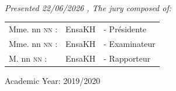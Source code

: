 \documentclass[a4paper,12pt]{report}
\begin{document}
\begin{titlepage}
\begin{minipage}{0.4\textwidth}
\begin{flushright}
  \end{flushright}
\end{minipage}\\[1cm]

{\large \textit{Presented 22/06/2026 , The jury composed of: }}\\[0.5cm]

\centering
\begin{tabular}{lll}
\large Mme. nn \textsc{nn} : & \large EnsaKH & \large - Présidente \\[0.1cm]
\large Mme. nn \textsc{nn} : & \large EnsaKH & \large - Examinateur \\[0.1cm]
\large M. nn \textsc{nn} : & \large EnsaKH & \large - Rapporteur
\end{tabular}

\vspace{20mm}
{\large Academic Year: 2019/2020}

\end{titlepage}
\end{document}
